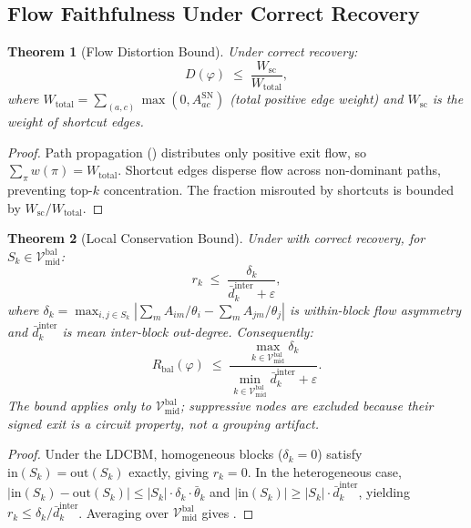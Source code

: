\documentclass[11pt]{article}
\newtheorem{theorem}{Theorem}[section]
\newcommand{\cV}{\mathcal{V}}
\newcommand{\1}{\mathbbm{1}}
\newcommand{\eps}{\varepsilon}
\newcommand{\Rbal}{R_{\mathrm{bal}}(\varphi)}
\begin{document}
\subsection{Flow Faithfulness Under Correct Recovery}
\label{sec:flow-theory}

\begin{theorem}[Flow Distortion Bound]
\label{thm:flow-distortion}
  Under correct recovery:
  \begin{equation}
    D(\varphi) \;\le\; \frac{W_{\mathrm{sc}}}{W_{\mathrm{total}}},
  \end{equation}
  where $W_{\mathrm{total}} = \sum_{(a,c)} \max(0, A^{\mathrm{SN}}_{ac})$ (total positive edge weight) and $W_{\mathrm{sc}}$ is the weight of shortcut edges.
\end{theorem}

\begin{proof}
  Path propagation () distributes only positive exit flow, so $\sum_\pi w(\pi) = W_{\mathrm{total}}$.
  Shortcut edges disperse flow across non-dominant paths, preventing top-$k$ concentration.
  The fraction misrouted by shortcuts is bounded by $W_{\mathrm{sc}}/W_{\mathrm{total}}$.
\end{proof}

\begin{theorem}[Local Conservation Bound]
\label{thm:local-residual}
  Under  with correct recovery, for $S_k \in \cV^{\mathrm{bal}}_{\mathrm{mid}}$:
  \begin{equation}
    r_k \;\le\; \frac{\delta_k}{\bar{d}^{\mathrm{inter}}_k + \eps},
  \end{equation}
  where $\delta_k = \max_{i,j \in S_k}|\sum_m A_{im}/\theta_i - \sum_m A_{jm}/\theta_j|$ is within-block flow asymmetry and $\bar{d}^{\mathrm{inter}}_k$ is mean inter-block out-degree. Consequently:
  \begin{equation}
    \Rbal \;\le\; \frac{\max_{k \in \cV^{\mathrm{bal}}_{\mathrm{mid}}} \delta_k}{\min_{k \in \cV^{\mathrm{bal}}_{\mathrm{mid}}} \bar{d}^{\mathrm{inter}}_k + \eps}.
    \label{eq:R-phi-bound}
  \end{equation}
  The bound applies only to $\cV^{\mathrm{bal}}_{\mathrm{mid}}$; suppressive nodes are excluded because their signed exit is a circuit property, not a grouping artifact.
\end{theorem}

\begin{proof}
  Under the LDCBM, homogeneous blocks ($\delta_k = 0$) satisfy $\mathrm{in}(S_k) = \mathrm{out}(S_k)$ exactly, giving $r_k = 0$.
  In the heterogeneous case, $|\mathrm{in}(S_k) - \mathrm{out}(S_k)| \le |S_k| \cdot \delta_k \cdot \bar\theta_k$ and $|\mathrm{in}(S_k)| \ge |S_k| \cdot \bar{d}^{\mathrm{inter}}_k$, yielding $r_k \le \delta_k / \bar{d}^{\mathrm{inter}}_k$. Averaging over $\cV^{\mathrm{bal}}_{\mathrm{mid}}$ gives .
\end{proof}
\end{document}
